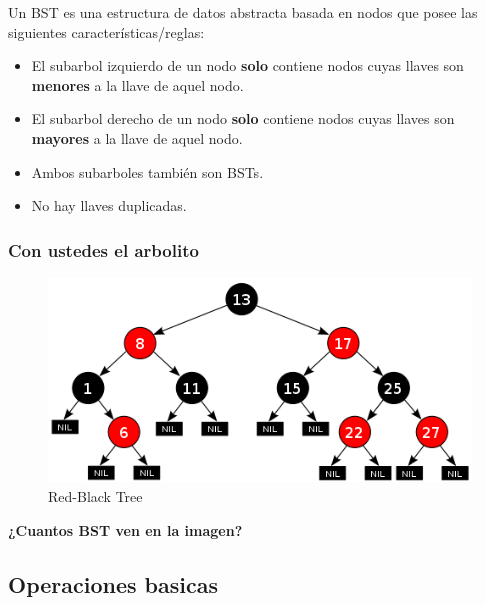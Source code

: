 \documentclass{beamer}
\begin{document}
		\begin{frame}
			Un BST es una estructura de datos abstracta basada en nodos que posee las siguientes características/reglas:
			\begin{itemize}[<+->]
				\item El subarbol izquierdo de un nodo \textbf{solo} contiene nodos cuyas llaves son \textbf{menores} a la llave de aquel nodo.
				\item El subarbol derecho de un nodo \textbf{solo} contiene nodos cuyas llaves son \textbf{mayores} a la llave de aquel nodo.
				\item Ambos subarboles también son BSTs.
				\item No hay llaves duplicadas.
			\end{itemize}
		\end{frame}

		\begin{frame}
			\frametitle{Con ustedes el arbolito}
			\begin{figure}
  				\centering
    			\includegraphics[scale=0.5]{rbtree.png}
  				\caption{Red-Black Tree}
  				\label{fig:ejemplo}
			\end{figure}
			
			\begin{center}
				\textbf{¿Cuantos BST ven en la imagen?}
			\end{center}
		\end{frame}

	\subsection{Operaciones basicas}

\end{document}
